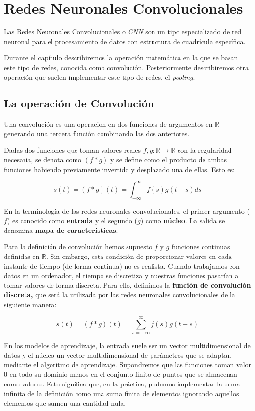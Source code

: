 \chapter{Redes Neuronales Convolucionales}\label{cnn}

	Las Redes Neuronales Convolucionales o \textit{CNN} son un tipo especializado de red neuronal para el procesamiento de datos con estructura de cuadrícula específica. 
	
	Durante el capítulo describiremos la operación matemática en la que se basan este tipo de redes, conocida como convolución. Posteriormente describiremos otra operación que suelen implementar este tipo de redes, el \textit{pooling}. 
	
	
	\section{La operación de Convolución}
	
	Una convolución es una operacion en dos funciones de argumentos en $\mathbb{R}$ generando una tercera función combinando las dos anteriores. 
	
	Dadas dos funciones que toman valores reales $f, g: \mathbb{R} \rightarrow \mathbb{R}$ con la regularidad necesaria, se denota como $(f \ast g)$ y se define como el producto de ambas funciones habiendo previamente invertido y desplazado una de ellas. Esto es:
	
	$$
		s(t) =	(f \ast g)(t) = \int_{- \infty}^{\infty} f(s) g(t-s) ds
	$$	
	
	En la terminología de las redes neuronales convolucionales, el primer argumento ($f$) es conocido como \textbf{entrada}  y el segundo ($g$) como \textbf{núcleo}. La salida se denomina \textbf{mapa de características}. 
	
	 Para la definición de convolución hemos supuesto $f$ y $g$ funciones continuas definidas en $\mathbb{R}$. Sin embargo, esta condición de proporcionar valores en cada instante de tiempo (de forma continua) no es realista. Cuando trabajamos con datos en un ordenador, el tiempo se discretiza y nuestras funciones pasarían a tomar valores de forma discreta. Para ello, definimos la \textbf{función de convolución discreta,} que será la utilizada por las redes neuronales convolucionales de la siguiente manera:
	 
	 $$
		 s(t) =	(f \ast g)(t) = \sum_{s = - \infty}^{\infty} f(s) g(t-s) 
	 $$
	 
	En los modelos de aprendizaje, la entrada suele ser un vector multidimensional de datos y el núcleo un vector multidimensional de parámetros que se adaptan mediante el algoritmo de aprendizaje. Supondremos que las funciones toman valor 0 en todo su dominio menos en el conjunto finito de puntos que se almacenan como valores. Esto significa que, en la práctica, podemos implementar la suma infinita de la definición como una suma finita de elementos ignorando aquellos elementos que sumen una cantidad nula.
	
